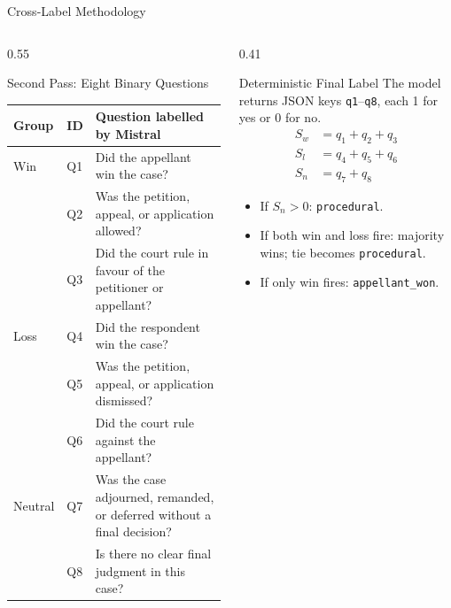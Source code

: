 \documentclass[aspectratio=169,11pt]{beamer}
\newenvironment{tightitemize}{
  \begin{itemize}
    \setlength{\itemsep}{2pt}
    \setlength{\parskip}{0pt}
}{\end{itemize}}
\begin{document}
\begin{frame}{Cross-Label Methodology}
  \tiny
  \begin{columns}[T,onlytextwidth]
    \begin{column}{0.55\textwidth}
      \begin{block}{Second Pass: Eight Binary Questions}
        \tiny
        \setlength{\tabcolsep}{3pt}
        \begin{tabular}{@{}p{1.25cm}p{0.45cm}p{4.85cm}@{}}
          \toprule
          Group & ID & Question labelled by Mistral \\
          \midrule
          Win & Q1 & Did the appellant win the case? \\
              & Q2 & Was the petition, appeal, or application allowed? \\
              & Q3 & Did the court rule in favour of the petitioner or appellant? \\
          Loss & Q4 & Did the respondent win the case? \\
               & Q5 & Was the petition, appeal, or application dismissed? \\
               & Q6 & Did the court rule against the appellant? \\
          Neutral & Q7 & Was the case adjourned, remanded, or deferred without a final decision? \\
                  & Q8 & Is there no clear final judgment in this case? \\
          \bottomrule
        \end{tabular}
      \end{block}
    \end{column}
    \begin{column}{0.41\textwidth}
      \begin{block}{Deterministic Final Label}
        The model returns JSON keys \texttt{q1}--\texttt{q8}, each 1 for yes or 0 for no.
        \[
          \begin{aligned}
            S_w&=q_1+q_2+q_3\\
            S_l&=q_4+q_5+q_6\\
            S_n&=q_7+q_8
          \end{aligned}
        \]
        \begin{tightitemize}
          \item If $S_n>0$: \texttt{procedural}.
          \item If both win and loss fire: majority wins; tie becomes \texttt{procedural}.
          \item If only win fires: \texttt{appellant\_won}.

\end{tightitemize}
\end{block}
\end{column}
\end{columns}
\end{frame}
\end{document}
